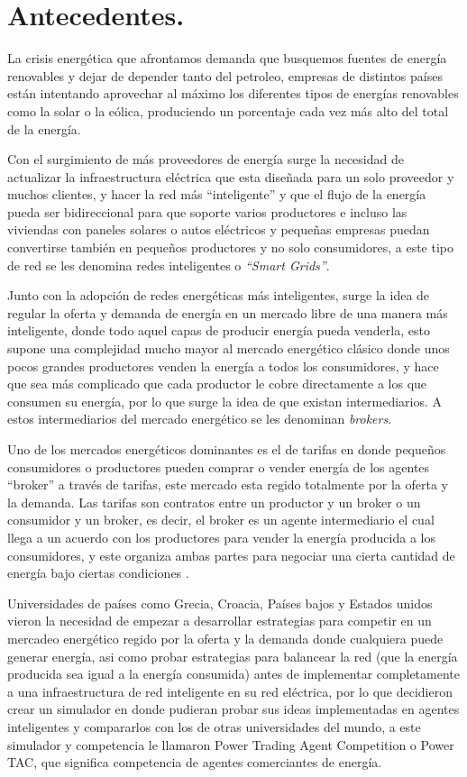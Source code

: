 \section{Antecedentes.}

La crisis energética que afrontamos demanda que busquemos fuentes de energía renovables y dejar de depender tanto del petroleo, empresas de distintos países están intentando aprovechar al máximo los diferentes tipos de energías renovables como la solar o la eólica, produciendo un porcentaje cada vez más alto del total de la  energía. 

Con el surgimiento de más proveedores de energía surge la necesidad de actualizar la infraestructura eléctrica que esta diseñada para un solo proveedor y muchos clientes, y hacer la red más ``inteligente'' y que el flujo de la energía pueda ser bidireccional para que soporte varios productores e incluso las viviendas con paneles solares o autos eléctricos y pequeñas empresas puedan convertirse también en pequeños productores y no solo consumidores, a este tipo de red se les denomina redes inteligentes o \textit{``Smart Grids''}.

Junto con la adopción de redes energéticas más inteligentes, surge la idea de regular la oferta y demanda de energía en un mercado libre de una manera más inteligente, donde todo aquel capas de producir energía pueda venderla, esto supone una complejidad mucho mayor al mercado energético clásico donde unos pocos grandes productores venden la energía a todos los consumidores, y hace que sea más complicado que cada productor le cobre directamente a los que consumen su energía, por lo que surge la idea de que existan intermediarios. A estos intermediarios del mercado energético se les denominan \textit{brokers}.

Uno de los mercados energéticos dominantes es el de tarifas en donde pequeños consumidores o productores pueden comprar o vender energía de los agentes ``broker'' a través de tarifas, este mercado esta regido totalmente por la oferta y la demanda.
Las tarifas son contratos entre un productor y un broker o un consumidor y un broker, es decir, el broker es un agente intermediario el cual llega a un acuerdo con los productores para vender la energía producida a los consumidores, y este organiza ambas partes para negociar una cierta cantidad de energía bajo ciertas condiciones \cite{MPAlonsoAYRGonzalezDesarrolloDeTec}.

Universidades de países como Grecia, Croacia, Países bajos y Estados unidos vieron la necesidad de empezar a desarrollar estrategias para competir en un mercadeo energético regido por la oferta y la demanda donde cualquiera puede generar energía, asi como probar estrategias para balancear la red (que la energía producida sea igual a la energía consumida) antes de implementar completamente a una infraestructura de red inteligente en su red eléctrica, por lo que decidieron crear un simulador en donde pudieran probar sus ideas implementadas en agentes inteligentes y compararlos con los de otras universidades del mundo, a este simulador y competencia le llamaron Power Trading Agent Competition o Power TAC, que significa competencia de agentes comerciantes de energía.


